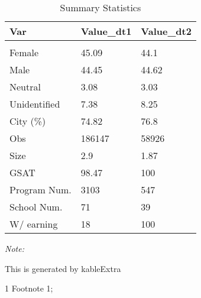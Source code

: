 \begin{table}
\centering
\caption{Summary Statistics}
\centering
\begin{threeparttable}
\begin{tabular}[t]{lll}
\toprule
Var & Value\_dt1 & Value\_dt2\\
\midrule
\addlinespace[0.3em]
\multicolumn{3}{l}{\textit{\textbf{Gender}}}\\
\hspace{1em}Female & 45.09 & 44.1\\
\hspace{1em}Male & 44.45 & 44.62\\
\hspace{1em}Neutral & 3.08 & 3.03\\
\hspace{1em}Unidentified & 7.38 & 8.25\\
City (\%) & 74.82 & 76.8\\
Obs & 186147 & 58926\\
Size & 2.9 & 1.87\\
GSAT & 98.47 & 100\\
Program Num. & 3103 & 547\\
School Num. & 71 & 39\\
W/ earning & 18 & 100\\
\bottomrule
\end{tabular}
\begin{tablenotes}
\item \textit{Note: } 
\item This is generated by kableExtra
\item[1] Footnote 1; 
\end{tablenotes}
\end{threeparttable}
\end{table}
